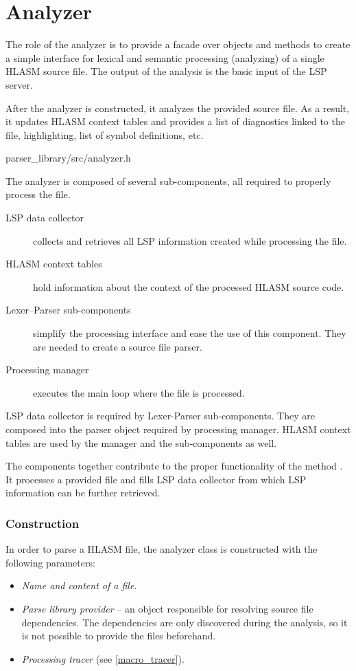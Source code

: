 \chapter {Analyzer}
\label{chap:analyzer}

The role of the analyzer is to provide a facade over objects and methods to create a simple interface for lexical and semantic processing (analyzing) of a single HLASM source file. The output of the analysis is the basic input of the LSP server.


After the analyzer is constructed, it analyzes the provided source file. As a result, it updates HLASM context tables and provides a list of diagnostics linked to the file, highlighting, list of symbol definitions, etc.


{parser\_library/src/analyzer.h}

The analyzer is composed of several sub-components, all required to properly process the file. 
\begin{description}
	\item[LSP data collector] collects and retrieves all LSP information created while processing the file.
	\item[HLASM context tables] hold information about the context of the processed HLASM source code.
	\item[Lexer--Parser sub-components] simplify the processing interface and ease the use of this component. They are needed to create a source file parser.
	\item[Processing manager] executes the main loop where the file is processed.
\end{description}

LSP data collector is required by Lexer-Parser sub-components. They are composed into the parser object required by processing manager. HLASM context tables are used by the manager and the sub-components as well. 

The components together contribute to the proper functionality of the method . It processes a provided file and fills LSP data collector from which LSP information can be further retrieved.  

\subsection{Construction}

In order to parse a HLASM file, the analyzer class is constructed with the following parameters:
\begin{itemize}
	\item \emph{Name and content of a file.}
	\item \emph{Parse library provider} -- an object responsible for resolving source file dependencies. The dependencies are only discovered during the analysis, so it is not possible to provide the files beforehand.
	\item \emph{Processing tracer} (see \cref{macro_tracer}).
\end{itemize}

